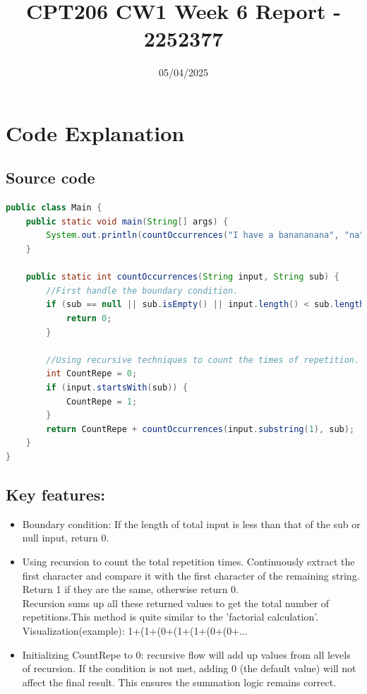 \documentclass[12pt,a4paper]{article}
\title{CPT206 CW1 Week 6 Report - 2252377}
\date{05/04/2025}
\begin{document}
\maketitle

\section{Code Explanation}
\subsection{Source code}
\begin{lstlisting}[language=Java]
public class Main {
    public static void main(String[] args) {
        System.out.println(countOccurrences("I have a banananana", "na"));//The result should be 4.
    }

    public static int countOccurrences(String input, String sub) {
        //First handle the boundary condition.
        if (sub == null || sub.isEmpty() || input.length() < sub.length()) {
            return 0;
        }
        
        //Using recursive techniques to count the times of repetition.
        int CountRepe = 0;
        if (input.startsWith(sub)) {
            CountRepe = 1;
        }
        return CountRepe + countOccurrences(input.substring(1), sub);
    }
}
\end{lstlisting}

\subsection{Key features:}
\begin{itemize}
\item Boundary condition: If the length of total input is less than that of the sub or null input, return 0.
\item Using recursion to count the total repetition times. Continuously extract the first character and compare it with the first character of the remaining string. Return 1 if they are the same, otherwise return 0. \\
Recursion sums up all these returned values to get the total number of repetitions.This method is quite similar to the 'factorial calculation'.\\ 
Visualization(example): 1+(1+(0+(1+(1+(0+(0+...
\item Initializing CountRepe to 0: recursive flow will add up values from all levels of recursion. If the condition is not met, adding 0 (the default value) will not affect the final result. This ensures the summation logic remains correct.
\end{itemize}
\end{document}
